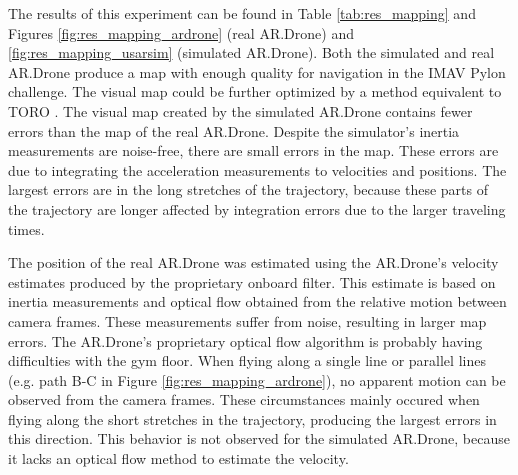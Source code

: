 
The results of this experiment can be found in Table \ref{tab:res_mapping} and Figures \ref{fig:res_mapping_ardrone} (real AR.Drone) and \ref{fig:res_mapping_usarsim} (simulated AR.Drone).
Both the simulated and real AR.Drone produce a map with enough quality for
navigation in the IMAV Pylon challenge.
The visual map could be further optimized by a method equivalent to TORO \cite{Grisetti2007iros}.
The visual map created by the simulated AR.Drone contains fewer errors than the map of the real AR.Drone.
Despite the simulator's inertia measurements are noise-free, there are small errors in the map.
These errors are due to integrating the acceleration measurements to velocities and positions.
The largest errors are in the long stretches of the trajectory, because these parts of the trajectory are longer affected by integration errors due to the larger traveling times.

The position of the real AR.Drone was estimated using the AR.Drone's velocity estimates produced by the proprietary onboard filter.
This estimate is based on inertia measurements and optical flow obtained from the relative motion between camera frames.
These measurements suffer from noise, resulting in larger map errors.
The AR.Drone's proprietary optical flow algorithm is probably having difficulties with the gym floor.
When flying along a single line or parallel lines (e.g. path B-C in Figure \ref{fig:res_mapping_ardrone}), no apparent motion can be observed from the camera frames.
These circumstances mainly occured when flying along the short stretches in the trajectory, producing the largest errors in this direction.
This behavior is not observed for the simulated AR.Drone, because it lacks an optical flow method to estimate the velocity.

